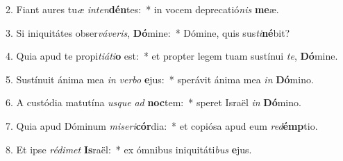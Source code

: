 2. Fiant aures tu\textit{æ} \textit{in}\textit{ten}\textbf{dén}tes:~*  in vocem deprecatió\textit{nis} \textbf{me}æ.\

3. Si iniquitátes obser\textit{vá}\textit{ve}\textit{ris}, \textbf{Dó}mine:~*  Dómine, quis sus\textit{ti}\textbf{né}bit?\

4. Quia apud te propi\textit{ti}\textit{á}\textit{ti}\textbf{o} est:~*  et propter legem tuam sustínui \textit{te}, \textbf{Dó}mine.\

5. Sustínuit ánima mea \textit{in} \textit{ver}\textit{bo} \textbf{e}jus:~*  sperávit ánima mea \textit{in} \textbf{Dó}mino.\

6. A custódia matutína \textit{us}\textit{que} \textit{ad} \textbf{noc}tem:~*  speret Israël \textit{in} \textbf{Dó}mino.\

7. Quia apud Dóminum \textit{mi}\textit{se}\textit{ri}\textbf{cór}dia:~*  et copiósa apud eum \textit{red}\textbf{émp}tio.\

8. Et ipse \textit{réd}\textit{i}\textit{met} \textbf{Is}raël:~*  ex ómnibus iniquitáti\textit{bus} \textbf{e}jus.\

